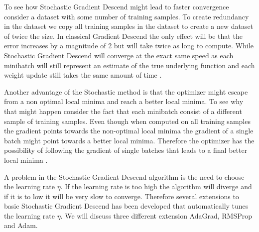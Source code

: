 To see how Stochastic Gradient Descend might lead to faster convergence consider
a dataset with some number of training samples. To create redundancy in the
dataset we copy all training samples in the dataset to create a new dataset of
twice the size. In classical Gradient Descend the only effect will be that the
error increases by a magnitude of 2 but will take twice as long to compute.
While Stochastic Gradient Descend will converge at the exact same speed as each
minibatch will still represent an estimate of the true underlying function and
each weight update still takes the same amount of time \cite{Bishop}.

Another advantage of the Stochastic method is that the optimizer might escape
from a non optimal local minima and reach a better local minima. To see why that
might happen consider the fact that each minibatch consist of a different sample
of training samples. Even though when computed on all training samples the
gradient points towards the non-optimal local minima the gradient of a single
batch might point towards a better local minima. Therefore the optimizer has the
possibility of following the gradient of single batches that leads to a final
better local minima \cite{Bishop}.

A problem in the Stochastic Gradient Descend algorithm is the need to choose
the learning rate $\eta$. If the learning rate is too high the algorithm
will diverge and if it is to low it will be very slow to converge. Therefore
several extensions to basic Stochastic Gradient Descend has been developed that
automatically tunes the learning rate $\eta$. We will discuss three different
extension \gls{AdaGrad}, \gls{RMSProp} and \gls{Adam}.

